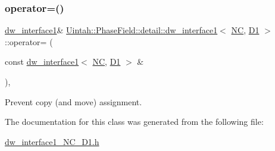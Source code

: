 \subsubsection{\texorpdfstring{operator=()}{operator=()}}
{\footnotesize\ttfamily \hyperlink{classUintah_1_1PhaseField_1_1detail_1_1dw__interface1}{dw\+\_\+interface1}\& \hyperlink{classUintah_1_1PhaseField_1_1detail_1_1dw__interface1}{Uintah\+::\+Phase\+Field\+::detail\+::dw\+\_\+interface1}$<$ \hyperlink{namespaceUintah_1_1PhaseField_a33d355affda78a83f45755ba8388cedda77924170fe82bfd58b74ca3e44139718}{NC}, \hyperlink{namespaceUintah_1_1PhaseField_a12bfc68444894dffdf0cb8d9cf0cc76aa24dcc0ba6bcb45bc6f503b1b538c6809}{D1} $>$\+::operator= (\begin{DoxyParamCaption}\item[{const \hyperlink{classUintah_1_1PhaseField_1_1detail_1_1dw__interface1}{dw\+\_\+interface1}$<$ \hyperlink{namespaceUintah_1_1PhaseField_a33d355affda78a83f45755ba8388cedda77924170fe82bfd58b74ca3e44139718}{NC}, \hyperlink{namespaceUintah_1_1PhaseField_a12bfc68444894dffdf0cb8d9cf0cc76aa24dcc0ba6bcb45bc6f503b1b538c6809}{D1} $>$ \&}]{ }\end{DoxyParamCaption})\hspace{0.3cm}{\ttfamily [protected]}, {\ttfamily [delete]}}



Prevent copy (and move) assignment. 



The documentation for this class was generated from the following file\+:\begin{DoxyCompactItemize}
\item 
\hyperlink{dw__interface1__NC__D1_8h}{dw\+\_\+interface1\+\_\+\+N\+C\+\_\+\+D1.\+h}\end{DoxyCompactItemize}
